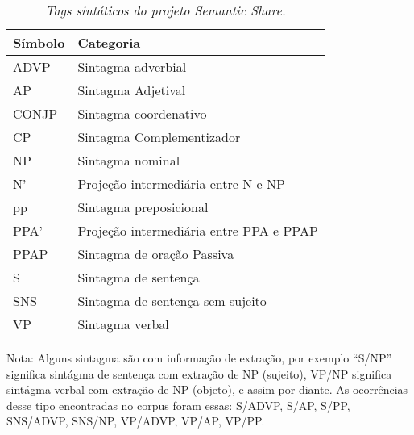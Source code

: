 \begin{table}
   \centering
   \small
   \caption{\it Tags sintáticos do projeto Semantic Share.}

    \begin{tabular}{ | p{3cm} | p{10cm} | }
      \hline
        \textbf{Símbolo} & \textbf{Categoria}\\
        \hline
        \hline

        ADVP& Sintagma adverbial \\
        \hline
        AP& Sintagma Adjetival\\
        \hline
        CONJP&Sintagma coordenativo\\
        \hline
        CP&Sintagma Complementizador\\
        \hline
        NP&Sintagma nominal\\
        \hline
        N'&Projeção intermediária entre N e NP\\
        \hline
        pp&Sintagma preposicional\\
        \hline
        PPA'&Projeção intermediária entre PPA e PPAP\\
        \hline
        PPAP&Sintagma de oração Passiva\\
        \hline
        S&Sintagma de sentença\\
        \hline
        SNS&Sintagma de sentença sem sujeito\\
        \hline
        VP&Sintagma verbal\\
        \hline

   \end{tabular}
   \label{tbl:semantic_share_cats}
\end{table}

Nota: Alguns sintagma são com informação de extração, por exemplo ``S/NP'' significa sintágma de sentença com extração de NP (sujeito), VP/NP significa sintágma verbal com extração de NP (objeto), e assim por diante. As ocorrências desse tipo encontradas no corpus foram essas: S/ADVP, S/AP, S/PP, SNS/ADVP, SNS/NP, VP/ADVP, VP/AP, VP/PP.

